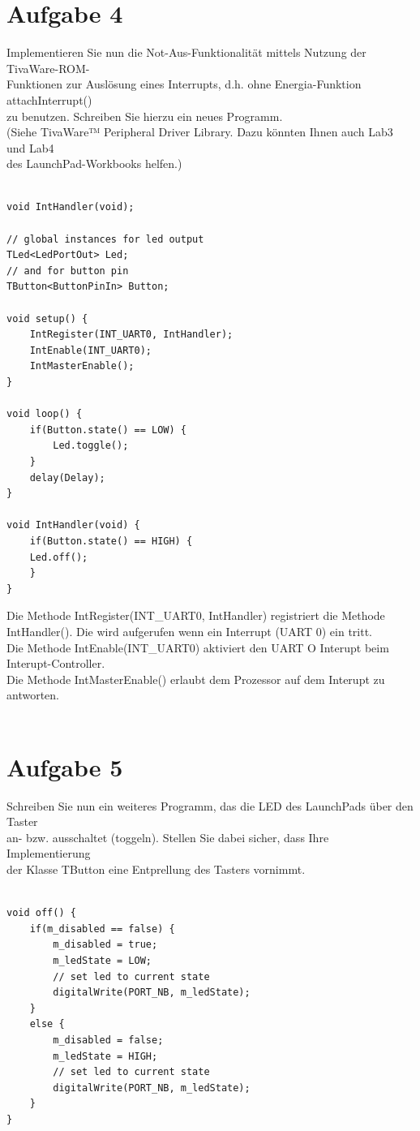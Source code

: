 \section{Aufgabe 4}
Implementieren Sie nun die Not-Aus-Funktionalität mittels Nutzung der TivaWare-ROM-\\
Funktionen zur Auslösung eines Interrupts, d.h. ohne Energia-Funktion attachInterrupt()\\
zu benutzen. Schreiben Sie hierzu ein neues Programm.\\
(Siehe TivaWare™ Peripheral Driver Library. Dazu könnten Ihnen auch Lab3 und Lab4\\
des LaunchPad-Workbooks helfen.)\\ \\
\begin{lstlisting}[label =lst:bash]
void IntHandler(void);

// global instances for led output
TLed<LedPortOut> Led;
// and for button pin 
TButton<ButtonPinIn> Button;

void setup() {
	IntRegister(INT_UART0, IntHandler);
	IntEnable(INT_UART0);
	IntMasterEnable();
}

void loop() {
	if(Button.state() == LOW) { 
		Led.toggle(); 
	}
	delay(Delay);
}

void IntHandler(void) {
	if(Button.state() == HIGH) {
	Led.off();
	} 
}
\end{lstlisting}
Die Methode IntRegister(INT\_UART0, IntHandler) registriert die Methode IntHandler(). Die wird aufgerufen wenn ein Interrupt (UART 0) ein tritt.\\
Die Methode IntEnable(INT\_UART0) aktiviert den UART O Interupt beim Interupt-Controller.\\
Die Methode IntMasterEnable() erlaubt dem Prozessor auf dem Interupt zu antworten.\\ \\
\newpage
\section{Aufgabe 5}
Schreiben Sie nun ein weiteres Programm, das die LED des LaunchPads über den Taster\\
an- bzw. ausschaltet (toggeln). Stellen Sie dabei sicher, dass Ihre Implementierung\\
der Klasse TButton eine Entprellung des Tasters vornimmt.\\ \\
\begin{lstlisting}[label =lst:bash]
void off() {
	if(m_disabled == false) {
		m_disabled = true; 
		m_ledState = LOW;
		// set led to current state      
		digitalWrite(PORT_NB, m_ledState);
	} 
	else {
		m_disabled = false;
		m_ledState = HIGH;
		// set led to current state      
		digitalWrite(PORT_NB, m_ledState);
	}
}
\end{lstlisting}
	